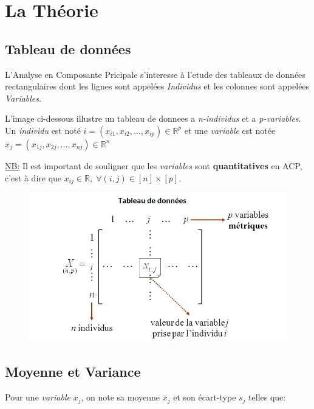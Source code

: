 \documentclass{article}
\begin{document}
\section{La Théorie}

\subsection{Tableau de données}

L'Analyse en Composante Pricipale s'interesse à l'etude des tableaux de données rectangulaires dont les lignes sont appelées \textit{Individus} et les colonnes sont appelées \textit{Variables}.
\newline

L'image ci-dessous illustre un tableau de donnees a \textit{n-individus} et a \textit{p-variables}. Un \textit{individu} est noté $i=(x_{i1},x_{i2}, ... ,x_{ip}) \in \mathbb{R}^p$ et une \textit{variable} est notée $x_j=(x_{1j},x_{2j}, ... ,x_{nj}) \in \mathbb{R}^n$
\newline

\underline{NB:} Il est important de souligner que les \textit{variables} sont \textbf{quantitatives} en ACP, c'est à dire que $x_{ij} \in \mathbb{R}, \; \forall (i,j) \in [n]\times[p].$

\begin{figure}[h!]
\includegraphics[width=\linewidth]{images/tableau.png}
\end{figure}

\subsection{Moyenne et Variance}

Pour une \textit{variable} ${x_j}$, on note sa moyenne $\bar{x}_j$ et son écart-type $s_j$ telles que:
\end{document}
